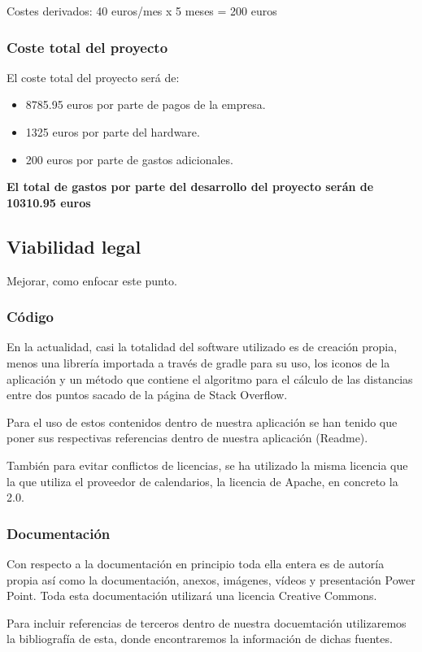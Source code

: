 Costes derivados: 
40 euros/mes x 5 meses = 200 euros

\subsubsection{Coste total del proyecto}

El coste total del proyecto será de:

\begin{itemize}
	\item 8785.95 euros por parte de pagos de la empresa.
	\item 1325 euros por parte del hardware.
	\item 200 euros por parte de gastos adicionales.
\end{itemize}

\textbf{El total de gastos por parte del desarrollo del proyecto serán de 10310.95 euros}

\subsection{Viabilidad legal}
Mejorar, como enfocar este punto.

\subsubsection{Código}
En la actualidad, casi la totalidad del software utilizado es de creación propia, menos una librería importada a través de gradle para su uso, los iconos de la aplicación y un método que contiene el algoritmo para el cálculo de las distancias entre dos puntos sacado de la página de Stack Overflow.

Para el uso de estos contenidos dentro de nuestra aplicación se han tenido que poner sus respectivas referencias dentro de nuestra aplicación (Readme).

También para evitar conflictos de licencias, se ha utilizado la misma licencia que la que utiliza el proveedor de calendarios, la licencia de Apache, en concreto la 2.0.

\subsubsection{Documentación}
Con respecto a la documentación en principio toda ella entera es de autoría propia así como la documentación, anexos, imágenes, vídeos y presentación Power Point. Toda esta documentación utilizará una licencia Creative Commons.

Para incluir referencias de terceros dentro de nuestra docuemtación utilizaremos la bibliografía de esta, donde encontraremos la información de dichas fuentes.

